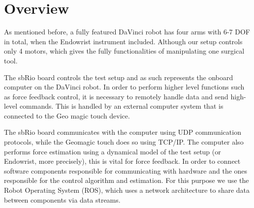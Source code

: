 \section{Overview}
As mentioned before, a fully featured DaVinci robot has four arms with 6-7 \gls{DOF} in total, when the Endowrist instrument included.
Although our setup controls only 4 motors, which gives the fully functionalities of manipulating one surgical tool.

The sbRio board controls the test setup and as such represents the onboard computer on the DaVinci robot.
In order to perform higher level functions such as force feedback control, it is necessary to remotely handle data and send high-level commands.
This is handled by an external computer system that is connected to the Geo magic touch device.

The sbRio board communicates with the computer using UDP communication protocols, while the Geomagic touch does so using TCP/IP.
The computer also performs force estimation using a dynamical model of the test setup (or Endowrist, more precisely), this is vital for force feedback.
In order to connect software components responsible for communicating with hardware and the ones responsible for the control algorithm and estimation.
For this purpose we use the Robot Operating System (ROS), which uses a network architecture to share data between components via data streams.





